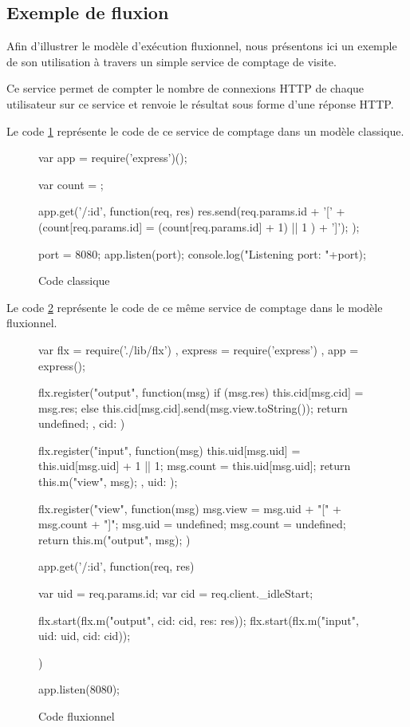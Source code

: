 \subsection{Exemple de fluxion}

Afin d'illustrer le modèle d'exécution fluxionnel, nous présentons ici un exemple de son utilisation à travers un simple service de comptage de visite.

Ce service permet de compter le nombre de connexions HTTP de chaque utilisateur sur ce service et renvoie le résultat sous forme d'une réponse HTTP.

Le code \ref{lst:classique} représente le code de ce service de comptage dans un modèle classique.

\begin{figure}
  \begin{code}
  var app = require('express')();

  var count = {};

  app.get('/:id', function(req, res){
    res.send(req.params.id + '[' + (count[req.params.id] = (count[req.params.id] + 1) || 1 ) + ']');
  });

  port = 8080;
  app.listen(port);
  console.log("Listening port: "+port);
  \end{code}
  \caption{Code classique}
  \label{lst:classique}
\end{figure}

Le code \ref{lst:fluxionnel} représente le code de ce même service de comptage dans le modèle fluxionnel.

\begin{figure}
  \begin{code}
  var flx = require('./lib/flx')
    , express = require('express')
    , app = express();

  flx.register("output", function(msg){
    if (msg.res) {
      this.cid[msg.cid] = msg.res;
    } else {
      this.cid[msg.cid].send(msg.view.toString());
    }
    return undefined;
  }, {
    cid: {}
  })

  flx.register("input", function(msg){
    this.uid[msg.uid] = this.uid[msg.uid] + 1 || 1;
    msg.count = this.uid[msg.uid];
    return this.m("view", msg);
  },{
    uid: {}
  });

  flx.register("view", function(msg) {
    msg.view = msg.uid + "[" + msg.count + "]";
    msg.uid = undefined;
    msg.count = undefined;
    return this.m("output", msg);
  })

  app.get('/:id', function(req, res) {
    var uid = req.params.id;
    var cid = req.client._idleStart;

    flx.start(flx.m("output", {cid: cid, res: res}));
    flx.start(flx.m("input", {uid: uid, cid: cid}));
  })

  app.listen(8080);
  \end{code}
  \caption{Code fluxionnel}
  \label{lst:fluxionnel}
\end{figure}

